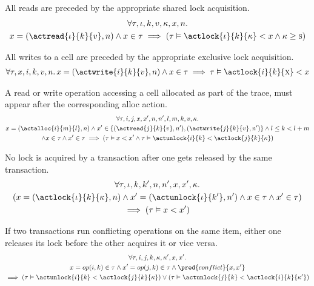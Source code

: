 \begin{lem}
	All reads are preceded by the appropriate shared lock acquisition.
	\begin{gather*}
		\forall \tau, \iota, k, v, \kappa, x, n \ldotp \\
		x = (\actread{\iota}{k}{v}, n) \land x \in \tau \implies \left( \tau \vDash \actlock{\iota}{k}{\kappa} < x \land \kappa \geq \textsc{s} \right)
	\end{gather*}
\end{lem}

\begin{lem}
	All writes to a cell are preceded by the appropriate exclusive lock acquisition.
	\begin{gather*}
		\forall \tau, x, i, k, v, n \ldotp
		x = (\actwrite{i}{k}{v}, n) \land x \in \tau \implies
		\tau \vDash \actlock{i}{k}{\textsc{x}} < x
	\end{gather*}
\end{lem}

\begin{lem}
	A read or write operation accessing a cell allocated as part of the trace, must appear after the corresponding alloc action.
	\begin{gather*}
		\forall \tau, i, j, x, x', n, n', l, m, k, v, \kappa \ldotp \\
		x = (\actalloc{i}{m}{l}, n) \land x' \in \{ (\actread{j}{k}{v}, n'), (\actwrite{j}{k}{v}, n') \} \land l \leq k < l + m
		\\
		\land x \in \tau \land x' \in \tau
		\implies
		\left( \tau \vDash x < x'  \land \tau \vDash \actunlock{i}{k} < \actlock{j}{k}{\kappa} \right)
	\end{gather*}
\end{lem}

\begin{lem}
	No lock is acquired by a transaction after one gets released by the same transaction.
	\begin{gather*}
		\forall \tau, \iota, k, k', n, n', x, x', \kappa \ldotp \\
		\left( x = (\actlock{\iota}{k}{\kappa}, n) \land x' = (\actunlock{\iota}{k'}, n') \land x \in \tau \land x' 	\in \tau \right) \\
		\implies \left( \tau \vDash x < x' \right)
	\end{gather*}
\end{lem}

\begin{lem}
	If two transactions run conflicting operations on the same item, either one releases its lock before the other acquires it or vice versa.
	\begin{gather*}
		\forall \tau, i, j, k, \kappa, \kappa', x, x' \ldotp \\
		x = op(i, k) \in \tau \land x' = op(j, k) \in \tau \land \pred{conflict}{x, x'} \\
		\implies \left( \tau \vDash \actunlock{i}{k} < \actlock{j}{k}{\kappa} \right) \lor \left( \tau \vDash \actunlock{j}{k} < \actlock{i}{k}{\kappa'} \right)
	\end{gather*}
\end{lem}

